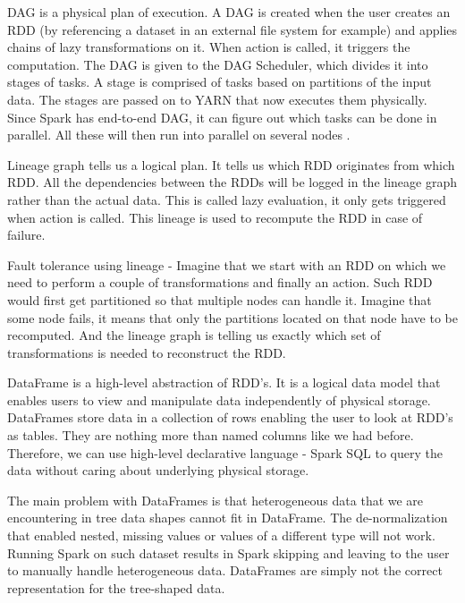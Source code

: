 DAG is a physical plan of execution. A DAG is created when the user creates an RDD (by referencing a dataset in an external file system for example) and applies chains of lazy transformations on it. When action is called, it triggers the computation. The DAG is given to the DAG Scheduler, which divides it into stages of tasks. A stage is comprised of tasks based on partitions of the input data. The stages are passed on to YARN that now executes them physically. Since Spark has end-to-end DAG, it can figure out which tasks can be done in parallel. All these will then run into parallel on several nodes \cite{BigDataCourse}. %

Lineage graph tells us a logical plan. It tells us which RDD originates from which RDD. All the dependencies between the RDDs will be logged in the lineage graph rather than the actual data. This is called lazy evaluation, it only gets triggered when action is called. This lineage is used to recompute the RDD in case of failure.

Fault tolerance using lineage - Imagine that we start with an RDD on which we need to perform a couple of transformations and finally an action. Such RDD would first get partitioned so that multiple nodes can handle it. Imagine that some node fails, it means that only the partitions located on that node have to be recomputed. And the lineage graph is telling us exactly which set of transformations is needed to reconstruct the RDD.

DataFrame is a high-level abstraction of RDD's. It is a logical data model that enables users to view and manipulate data independently of physical storage. DataFrames store data in a collection of rows enabling the user to look at RDD's as tables. They are nothing more than named columns like we had before. Therefore, we can use high-level declarative language - Spark SQL to query the data without caring about underlying physical storage.

The main problem with DataFrames is that heterogeneous data that we are encountering in tree data shapes cannot fit in DataFrame. The de-normalization that enabled nested, missing values or values of a different type will not work. Running Spark on such dataset results in Spark skipping and leaving to the user to manually handle heterogeneous data. DataFrames are simply not the correct representation for the tree-shaped data. 

